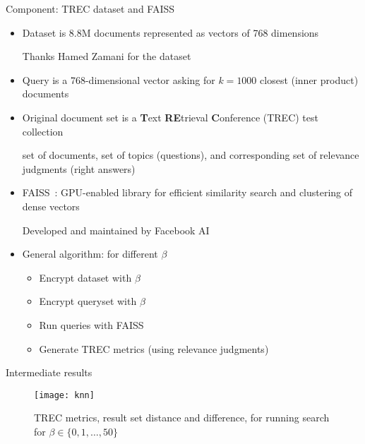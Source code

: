 	\begin{frame}{Component: TREC dataset and FAISS~\cite{faiss}}

		\begin{itemize}
			\item<1->
				Dataset is 8.8M documents represented as vectors of 768 dimensions \\
				\begin{small}
					Thanks Hamed Zamani for the dataset
				\end{small}

			\item<2->
				Query is a 768-dimensional vector asking for $k = 1000$ closest (inner product) documents

			\item<3->
				Original document set is a \textbf{T}ext \textbf{RE}trieval \textbf{C}onference (TREC) test collection \\
				\begin{small}
					set of documents, set of topics (questions), and corresponding set of relevance judgments (right answers)
				\end{small}

			\item<4->
				FAISS~\cite{faiss}: GPU-enabled library for efficient similarity search and clustering of dense vectors
				\begin{small}
					Developed and maintained by Facebook AI
				\end{small}

			\item<5->
				General algorithm: for different $\beta$
				\begin{itemize}
					\item Encrypt dataset with $\beta$
					\item Encrypt queryset with $\beta$
					\item Run queries with FAISS
					\item Generate TREC metrics (using relevance judgments)
				\end{itemize}

		\end{itemize}

	\end{frame}

	\begin{frame}{Intermediate results}

		\begin{figure}[h]
			\centering
			\texttt{[image: knn]}
			\caption{TREC metrics, result set distance and difference, for running \knn{} search for $\beta \in \{ 0, 1, \ldots , 50 \} $}
		\end{figure}

	\end{frame}
